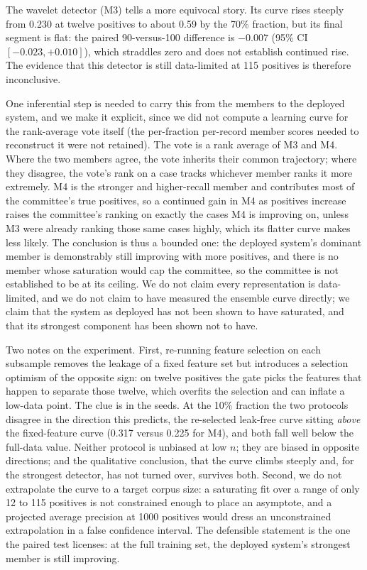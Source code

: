 \documentclass[11pt]{article}
\begin{document}
The wavelet detector (M3) tells a more equivocal story. Its curve rises steeply from 0.230 at twelve positives to about 0.59 by the 70\% fraction, but its final segment is flat: the paired 90-versus-100 difference is $-0.007$ (95\% CI $[-0.023, +0.010]$), which straddles zero and does not establish continued rise. The evidence that this detector is still data-limited at 115 positives is therefore inconclusive.

One inferential step is needed to carry this from the members to the deployed system, and we make it explicit, since we did not compute a learning curve for the rank-average vote itself (the per-fraction per-record member scores needed to reconstruct it were not retained). The vote is a rank average of M3 and M4. Where the two members agree, the vote inherits their common trajectory; where they disagree, the vote's rank on a case tracks whichever member ranks it more extremely. M4 is the stronger and higher-recall member and contributes most of the committee's true positives, so a continued gain in M4 as positives increase raises the committee's ranking on exactly the cases M4 is improving on, unless M3 were already ranking those same cases highly, which its flatter curve makes less likely. The conclusion is thus a bounded one: the deployed system's dominant member is demonstrably still improving with more positives, and there is no member whose saturation would cap the committee, so the committee is not established to be at its ceiling. We do not claim every representation is data-limited, and we do not claim to have measured the ensemble curve directly; we claim that the system as deployed has not been shown to have saturated, and that its strongest component has been shown not to have.

Two notes on the experiment. First, re-running feature selection on each subsample removes the leakage of a fixed feature set but introduces a selection optimism of the opposite sign: on twelve positives the gate picks the features that happen to separate those twelve, which overfits the selection and can inflate a low-data point. The clue is in the seeds. At the 10\% fraction the two protocols disagree in the direction this predicts, the re-selected leak-free curve sitting \emph{above} the fixed-feature curve (0.317 versus 0.225 for M4), and both fall well below the full-data value. Neither protocol is unbiased at low $n$; they are biased in opposite directions; and the qualitative conclusion, that the curve climbs steeply and, for the strongest detector, has not turned over, survives both. Second, we do not extrapolate the curve to a target corpus size: a saturating fit over a range of only 12 to 115 positives is not constrained enough to place an asymptote, and a projected average precision at 1000 positives would dress an unconstrained extrapolation in a false confidence interval. The defensible statement is the one the paired test licenses: at the full training set, the deployed system's strongest member is still improving.
\end{document}

